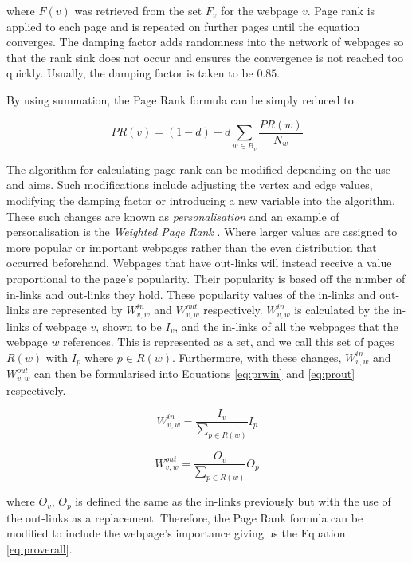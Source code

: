 where $F(v)$ was retrieved from the set $F_v$ for the webpage $v$. Page rank is applied to each page and is repeated on further pages until the equation converges. The damping factor adds randomness into the network of webpages so that the rank sink does not occur and ensures the convergence is not reached too quickly. Usually, the damping factor is taken to be $0.85$. 

By using summation, the Page Rank formula can be simply reduced to

\begin{equation}
PR(v) = (1 - d) + d\sum_{w \in B_v}\frac{PR(w)}{N_w}
\end{equation}

The algorithm for calculating page rank can be modified depending on the use and aims. Such modifications include adjusting the vertex and edge values, modifying the damping factor or introducing a new variable into the algorithm. These such changes are known as \emph{personalisation} and an example of personalisation is the \emph{Weighted Page Rank} \cite{xing2004weighted}. Where larger values are assigned to more popular or important webpages rather than the even distribution that occurred beforehand. Webpages that have out-links will instead receive a value proportional to the page's popularity. Their popularity is based off the number of in-links and out-links they hold. These popularity values of the in-links and out-links are represented by $W^{in}_{v,w}$ and $W^{out}_{v,w}$ respectively. $W^{in}_{v,w}$ is calculated by the in-links of webpage $v$, shown to be $I_v$, and the in-links of all the webpages that the webpage $w$ references. This is represented as a set, and we call this set of pages $R(w)$ with $I_p$ where $p \in R(w)$. Furthermore, with these changes, $W^{in}_{v,w}$ and $W^{out}_{v,w}$ can then be formularised into Equations \ref{eq:prwin} and \ref{eq:prout} respectively.

\begin{equation}\label{eq:prwin}
W^{in}_{v,w} = \frac{I_v}{\sum_{p \in R(w)}}{I_p}
\end{equation}

\begin{equation}\label{eq:prout}
W^{out}_{v,w} = \frac{O_v}{\sum_{p \in R(w)}}{O_p}
\end{equation}

where $O_v$, $O_p$ is defined the same as the in-links previously but with the use of the out-links as a replacement. Therefore, the Page Rank formula can be modified to include the webpage's importance giving us the Equation \ref{eq:proverall}.

